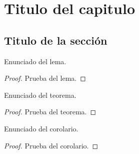 \chapter{Titulo del capitulo}\label{cap1}

\section{Titulo de la sección}\label{cap1:sec1}

\begin{lemma}\label{lema1}
    Enunciado del lema.
\end{lemma}

\begin{proof}
    Prueba del lema.
\end{proof}

\begin{theorem}\label{teorema1}
    Enunciado del teorema.
\end{theorem}

\begin{proof}
    Prueba del teorema.
\end{proof}

\begin{corollary}\label{corolario1}
    Enunciado del corolario.
\end{corollary}

\begin{proof}
    Prueba del corolario.
\end{proof}
